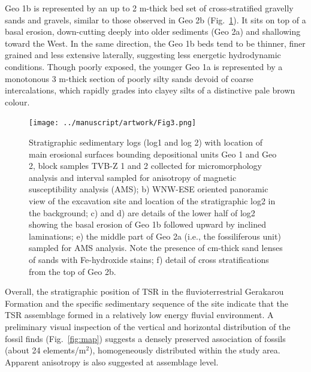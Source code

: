 \documentclass[5p,times,authoryear]{elsarticle}
\begin{document}
Geo 1b is represented by an up to 2 m-thick bed set of cross-stratified gravelly sands and gravels, similar to those observed in Geo 2b (Fig.~\ref{fig:log}). It sits on top of a basal erosion, down-cutting deeply into older sediments (Geo 2a) and shallowing toward the West. In the same direction, the Geo 1b beds tend to be thinner, finer grained and less extensive laterally, suggesting less energetic hydrodynamic conditions. Though poorly exposed, the younger Geo 1a is represented by a monotonous 3 m-thick section of poorly silty sands devoid of coarse intercalations, which rapidly grades into clayey silts of a distinctive pale brown colour.

\begin{figure}
  \centering
  \texttt{[image: ../manuscript/artwork/Fig3.png]}
  \caption{Stratigraphic sedimentary logs (log1 and log 2) with location of main erosional surfaces bounding depositional units Geo 1 and Geo 2, block samples TVB-Z 1 and 2 collected for micromorphology analysis and interval sampled for anisotropy of magnetic susceptibility analysis (AMS); b) WNW-ESE oriented panoramic view of the excavation site and location of the stratigraphic log2 in the background; c) and d) are details of the lower half of log2 showing the basal erosion of Geo 1b followed upward by inclined laminations; e) the middle part of Geo 2a (i.e., the fossiliferous unit) sampled for AMS analysis. Note the presence of cm-thick sand lenses of sands with Fe-hydroxide stains; f) detail of cross stratifications from the top of Geo 2b.}
  \label{fig:log}
\end{figure}

Overall, the stratigraphic position of TSR in the fluvioterrestrial Gerakarou Formation \citep{Koufos1995} and the specific sedimentary sequence of the site indicate that the TSR assemblage formed in a relatively low energy fluvial environment. A preliminary visual inspection of the vertical and horizontal distribution of the fossil finds (Fig.~\ref{fig:map}) suggests a densely preserved association of fossils (about 24 elements/m$^2$), homogeneously distributed within the study area. Apparent anisotropy is also suggested at assemblage level.
\end{document}
